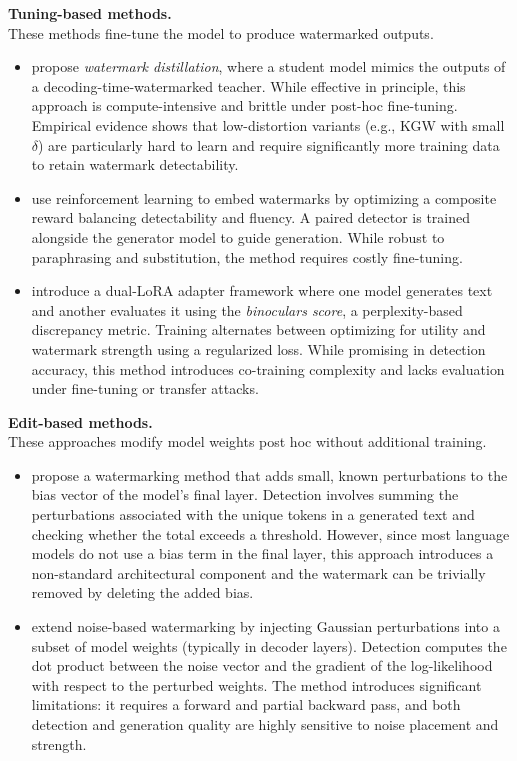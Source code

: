 \textbf{Tuning-based methods.} \\
These methods fine-tune the model to produce watermarked outputs.
\begin{itemize}
    \item \citet{gu2023learnability} propose \emph{watermark distillation}, where a student model mimics the outputs of a decoding-time-watermarked teacher. While effective in principle, this approach is compute-intensive and brittle under post-hoc fine-tuning. Empirical evidence shows that low-distortion variants (e.g., KGW with small \(\delta\)) are particularly hard to learn and require significantly more training data to retain watermark detectability.
    
    \item \citet{xu2024learningwatermarkllmgeneratedtext} use reinforcement learning to embed watermarks by optimizing a composite reward balancing detectability and fluency. A paired detector is trained alongside the generator model to guide generation. While robust to paraphrasing and substitution, the method requires costly fine-tuning.
    
    \item \citet{elhassan2024binoculars} introduce a dual-LoRA adapter framework where one model generates text and another evaluates it using the \emph{binoculars score}, a perplexity-based discrepancy metric. Training alternates between optimizing for utility and watermark strength using a regularized loss. While promising in detection accuracy, this method introduces co-training complexity and lacks evaluation under fine-tuning or transfer attacks.
\end{itemize}

\textbf{Edit-based methods.} \\
These approaches modify model weights post hoc without additional training.
\begin{itemize}
    \item \citet{christ2024provably} propose a watermarking method that adds small, known perturbations to the bias vector of the model's final layer. Detection involves summing the perturbations associated with the unique tokens in a generated text and checking whether the total exceeds a threshold. However, since most language models do not use a bias term in the final layer, this approach introduces a non-standard architectural component and the watermark can be trivially removed by deleting the added bias.

    \item \citet{block2025gaussmark} extend noise-based watermarking by injecting Gaussian perturbations into a subset of model weights (typically in decoder layers). Detection computes the dot product between the noise vector and the gradient of the log-likelihood with respect to the perturbed weights. The method introduces significant limitations: it requires a forward and partial backward pass, and both detection and generation quality are highly sensitive to noise placement and strength.
\end{itemize}

